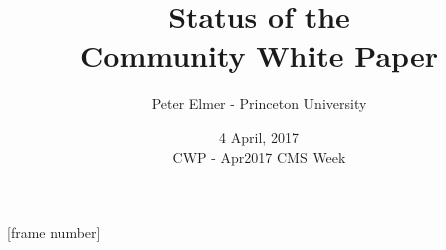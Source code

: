 \documentclass{beamer}
\title{Status of the\\
     Community White Paper}
\author{Peter Elmer - Princeton University}
\date{4 April, 2017 \\ CWP - Apr2017 CMS Week}
\begin{document}
\maketitle

%
%

[frame number]

















%
%





%
%
%

%
%

%
%
%
%

%
%

%

%
%
%

%
%

%
%

%
%
%

%

%

%

%

%
%
\end{document}
